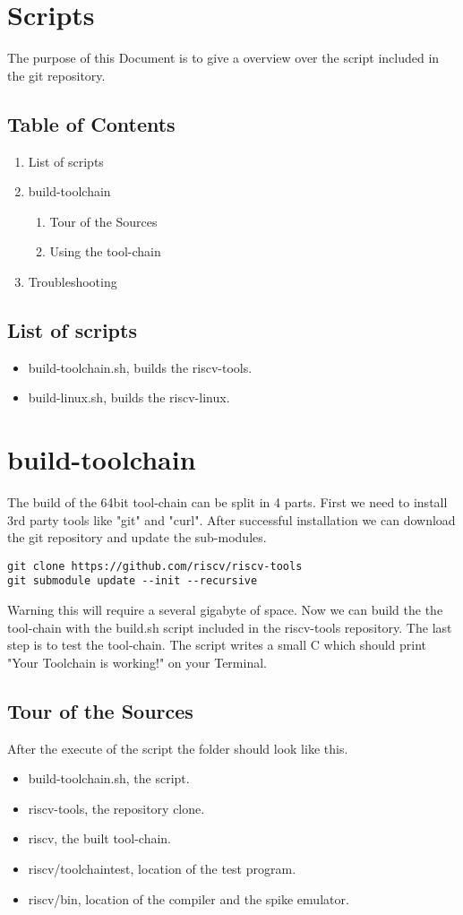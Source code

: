 \documentclass[a4paper, oneside]{scrreprt}
\author{Mike Wüstenberg}
\begin{document}
\chapter{Scripts}
 The purpose of this Document is to give a overview over the script included in the git repository.
 
\section{Table of Contents}
\begin{enumerate}
\item List of scripts 
\item build-toolchain 
\begin{enumerate}
\item Tour of the Sources
\item Using the tool-chain
\end{enumerate}
\item{Troubleshooting}
\end{enumerate}

\section{List of scripts}
\begin{itemize}
\item build-toolchain.sh, builds the riscv-tools.
\item build-linux.sh, builds the riscv-linux.
\end{itemize}

\chapter{build-toolchain}
The build of the 64bit tool-chain can be split in 4 parts. First we need to install 3rd party tools like "git" and "curl". After successful installation we can download the git repository and update the sub-modules.
\begin{lstlisting}
git clone https://github.com/riscv/riscv-tools
git submodule update --init --recursive
\end{lstlisting}
Warning this will require a several gigabyte of space. Now we can build the the tool-chain with the build.sh script included in the riscv-tools repository.
The last step is to test the tool-chain. The script writes a small C which should print "Your Toolchain is working!" on your Terminal.

\section{Tour of the Sources}
After the execute of the script the folder should look like this.
\begin{itemize}
\item build-toolchain.sh, the script.
\item riscv-tools, the repository clone.
\item riscv, the built tool-chain.
\item riscv/toolchaintest, location of the test program.
\item riscv/bin, location of the compiler and the spike emulator.
\end{itemize}
\end{document}
